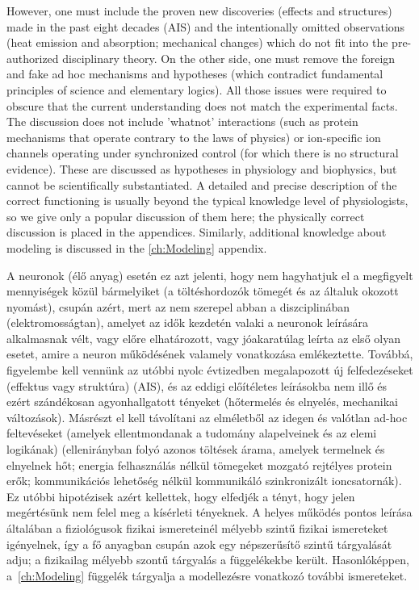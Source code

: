 \ifx\magyar\undefined
However, one must include the proven new discoveries (effects and structures) made in the past eight decades (\gls{AIS}) and the
intentionally omitted
observations (heat emission and absorption; mechanical changes) which do not fit into the pre-authorized disciplinary theory.
On the other side, one must remove the foreign and fake ad hoc mechanisms and hypotheses (which contradict fundamental principles of science and elementary logics). 
All those issues were required to obscure that the current understanding does not match the experimental facts.
The discussion does not include 'whatnot' interactions (such as protein mechanisms that operate contrary to the laws of physics) or ion-specific ion channels operating under synchronized control (for which there is no structural evidence). These are discussed as hypotheses in physiology and biophysics, but cannot be scientifically substantiated. A detailed and precise description of the correct functioning is usually beyond the typical knowledge level of physiologists, so we give only a popular discussion of them here; the physically correct discussion is placed in the appendices.
Similarly, additional knowledge about modeling is discussed in the \ref{ch:Modeling} appendix.

\else
A neuronok (élő anyag) esetén ez azt jelenti, hogy nem hagyhatjuk el a
megfigyelt mennyiségek közül bármelyiket (a töltéshordozók tömegét és az általuk okozott nyomást), csupán azért, mert 
az nem szerepel abban a diszciplinában (elektromosságtan), amelyet az idők kezdetén valaki
a neuronok leírására alkalmasnak vélt, vagy előre elhatározott,
vagy jóakaratúlag leírta az első olyan esetet, amire
a neuron működésének valamely vonatkozása emlékeztette.
Továbbá, figyelembe kell vennünk az utóbbi nyolc évtizedben  megalapozott új felfedezéseket (effektus vagy struktúra) (\gls{AIS}), 
és az eddigi előítéletes leírásokba nem illő és ezért szándékosan agyonhallgatott tényeket (hőtermelés és elnyelés, mechanikai változások).
Másrészt el kell távolítani az elméletből az idegen és
valótlan ad-hoc feltevéseket (amelyek ellentmondanak a tudomány
alapelveinek és az elemi logikának) (ellenirányban folyó azonos töltések árama, amelyek termelnek és elnyelnek hőt; energia felhasználás nélkül tömegeket mozgató rejtélyes protein erők; kommunikációs lehetőség nélkül kommunikáló szinkronizált ioncsatornák).
Ez utóbbi hipotézisek azért kellettek, hogy elfedjék a tényt,
hogy jelen megértésünk nem felel meg a kísérleti tényeknek.
A helyes működés pontos leírása általában a fiziológusok
fizikai ismereteinél mélyebb szintű fizikai ismereteket igényelnek,
így a fő anyagban csupán azok egy népszerűsítő szintű tárgyalását adju; a fizikailag mélyebb szontű tárgyalás a függelékekbe került.
Hasonlóképpen, a~\ref{ch:Modeling} függelék tárgyalja a 
modellezésre vonatkozó további ismereteket.

